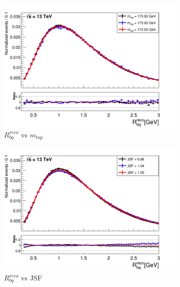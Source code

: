 \begin{landscape}
\begin{figure}
\begin{subfigure}{0.37\textwidth}
	\includegraphics[width=\linewidth]{Pics/PlotCombi/rbq_mtop.png}
	\caption{$R_{bq}^{reco}$ vs $m_{top}$} \label{fig:Rbqmtop}
\end{subfigure}
\hspace*{0.25cm}
\begin{subfigure}{0.37\textwidth}
	\includegraphics[width=\linewidth]{Pics/PlotCombi/rbq_JSF.png}
	\caption{$R_{bq}^{reco}$ vs JSF} \label{fig:RbqJSF}
\end{subfigure}
\hspace*{0.25cm}
\begin{subfigure}{0.37\textwidth}

\end{subfigure}
\end{figure}
\end{landscape}
